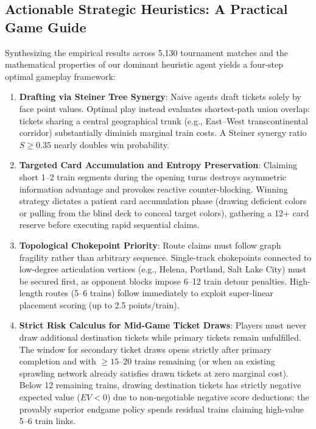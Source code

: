 \documentclass[conference,10pt]{IEEEtran}
\begin{document}
\subsection{Actionable Strategic Heuristics: A Practical Game Guide}
\label{subsec:strategic_guide}
Synthesizing the empirical results across 5,130 tournament matches and the mathematical properties of our dominant heuristic agent yields a four-step optimal gameplay framework:
\begin{enumerate}
    \item \textbf{Drafting via Steiner Tree Synergy}: Naive agents draft tickets solely by face point values. Optimal play instead evaluates shortest-path union overlap: tickets sharing a central geographical trunk (e.g., East--West transcontinental corridor) substantially diminish marginal train costs. A Steiner synergy ratio $S \ge 0.35$ nearly doubles win probability.
    \item \textbf{Targeted Card Accumulation and Entropy Preservation}: Claiming short 1--2 train segments during the opening turns destroys asymmetric information advantage and provokes reactive counter-blocking. Winning strategy dictates a patient card accumulation phase (drawing deficient colors or pulling from the blind deck to conceal target colors), gathering a 12+ card reserve before executing rapid sequential claims.
    \item \textbf{Topological Chokepoint Priority}: Route claims must follow graph fragility rather than arbitrary sequence. Single-track chokepoints connected to low-degree articulation vertices (e.g., Helena, Portland, Salt Lake City) must be secured first, as opponent blocks impose 6--12 train detour penalties. High-length routes (5--6 trains) follow immediately to exploit super-linear placement scoring (up to 2.5 points/train).
    \item \textbf{Strict Risk Calculus for Mid-Game Ticket Draws}: Players must never draw additional destination tickets while primary tickets remain unfulfilled. The window for secondary ticket draws opens strictly after primary completion and with $\ge 15$--$20$ trains remaining (or when an existing sprawling network already satisfies drawn tickets at zero marginal cost). Below 12 remaining trains, drawing destination tickets has strictly negative expected value ($EV < 0$) due to non-negotiable negative score deductions: the provably superior endgame policy spends residual trains claiming high-value 5--6 train links.
\end{enumerate}
\end{document}
